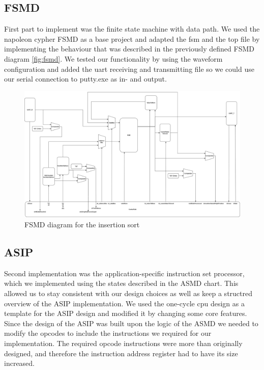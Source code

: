 \documentclass[conference]{IEEEtran}
\begin{document}
\subsection{FSMD}
First part to implement was the finite state machine with data path. We used the napoleon cypher FSMD as a base project and adapted the fsm and the top file by implementing the behaviour that was described in the previously defined FSMD diagram \autoref{fig:fsmd}. We tested our functionality by using the waveform configuration and added the uart receiving and transmitting file so we could use our serial connection to putty.exe as in- and output. 
\begin{figure}
    \centering
    \includegraphics[width=1\linewidth]{Images/FSMDInsertionSort.png}
    \caption{FSMD diagram for the insertion sort}
    \label{fig:fsmd}
\end{figure}

\subsection{ASIP}
Second implementation was the application-specific instruction set processor, which we implemented using the states described in the ASMD chart. This allowed us to stay consistent with our design choices as well as keep a structred overview of the ASIP implementation. We used the one-cycle cpu design as a template for the ASIP design and modified it by changing some core features.\\
Since the design of the ASIP was built upon the logic of the ASMD we needed to modify the opcodes to include the instructions we required for our implementation. The required opcode instructions were more than originally designed, and therefore the instruction address register had to have its size increased.\\
    
\end{document}
